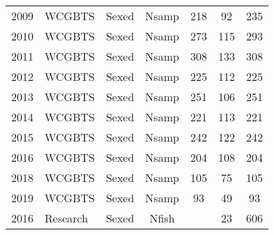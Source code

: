 \begin{longtable}[t]{c>{\centering\arraybackslash}p{3cm}ccccc}
2009 & WCGBTS & Sexed & Nsamp & 218 & 92 & 235\\
2010 & WCGBTS & Sexed & Nsamp & 273 & 115 & 293\\
2011 & WCGBTS & Sexed & Nsamp & 308 & 133 & 308\\
2012 & WCGBTS & Sexed & Nsamp & 225 & 112 & 225\\
2013 & WCGBTS & Sexed & Nsamp & 251 & 106 & 251\\
2014 & WCGBTS & Sexed & Nsamp & 221 & 113 & 221\\
2015 & WCGBTS & Sexed & Nsamp & 242 & 122 & 242\\
2016 & WCGBTS & Sexed & Nsamp & 204 & 108 & 204\\
2018 & WCGBTS & Sexed & Nsamp & 105 & 75 & 105\\
2019 & WCGBTS & Sexed & Nsamp & 93 & 49 & 93\\
2016 & Research & Sexed & Nfish &  & 23 & 606\\*
\end{longtable}
\endgroup{}
\endgroup{}
